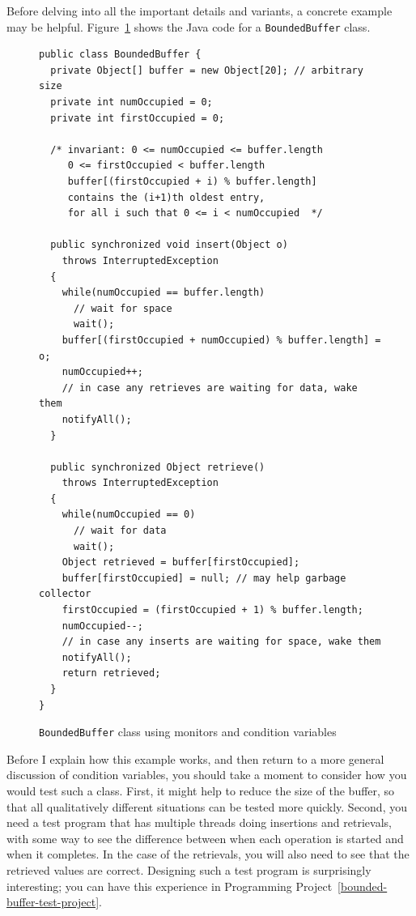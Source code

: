Before delving into all the important details and variants,
a concrete example may be helpful.  Figure~\ref{BoundedBuffer.java} shows the Java
code for a \verb|BoundedBuffer| class.
\begin{figure}
\begin{verbatim}
public class BoundedBuffer {
  private Object[] buffer = new Object[20]; // arbitrary size
  private int numOccupied = 0;
  private int firstOccupied = 0;

  /* invariant: 0 <= numOccupied <= buffer.length
     0 <= firstOccupied < buffer.length
     buffer[(firstOccupied + i) % buffer.length]
     contains the (i+1)th oldest entry,
     for all i such that 0 <= i < numOccupied  */

  public synchronized void insert(Object o)
    throws InterruptedException
  {
    while(numOccupied == buffer.length)
      // wait for space
      wait();
    buffer[(firstOccupied + numOccupied) % buffer.length] = o;
    numOccupied++;
    // in case any retrieves are waiting for data, wake them
    notifyAll();
  }

  public synchronized Object retrieve()
    throws InterruptedException
  {
    while(numOccupied == 0)
      // wait for data
      wait();
    Object retrieved = buffer[firstOccupied];
    buffer[firstOccupied] = null; // may help garbage collector
    firstOccupied = (firstOccupied + 1) % buffer.length;
    numOccupied--;
    // in case any inserts are waiting for space, wake them
    notifyAll();
    return retrieved;
  }
}
\end{verbatim}
\caption{{\tt BoundedBuffer} class using monitors and condition variables}
\label{BoundedBuffer.java}
\end{figure}

Before I explain how this example works, and then return to a more
general discussion of condition variables, you should take a moment to
consider how you would test such a class.  First, it might help to
reduce the size of the buffer, so that all qualitatively different
situations can be tested more quickly.  Second, you need a test program
that has multiple threads doing insertions and retrievals, with some
way to see the difference between when each operation is started and
when it completes.  In the case of the retrievals, you will also need
to see that the retrieved values are correct.  Designing such a test
program is surprisingly interesting; you can have this experience in Programming Project~\ref{bounded-buffer-test-project}.

